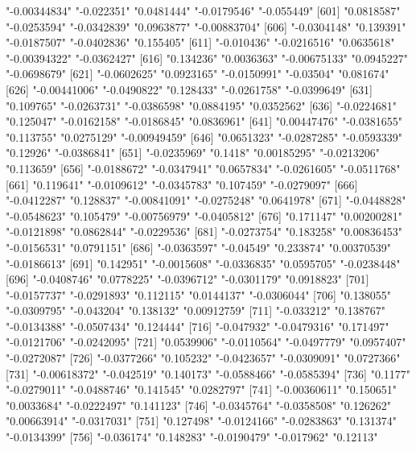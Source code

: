 \begin{Schunk}
\begin{Soutput}
[596] "-0.00344834"  "-0.022351"    "0.0481444"    "-0.0179546"   "-0.055449"   
[601] "0.0818587"    "-0.0253594"   "-0.0342839"   "0.0963877"    "-0.00883704" 
[606] "-0.0304148"   "0.139391"     "-0.0187507"   "-0.0402836"   "0.155405"    
[611] "-0.010436"    "-0.0216516"   "0.0635618"    "-0.00394322"  "-0.0362427"  
[616] "0.134236"     "0.0036363"    "-0.00675133"  "0.0945227"    "-0.0698679"  
[621] "-0.0602625"   "0.0923165"    "-0.0150991"   "-0.03504"     "0.081674"    
[626] "-0.00441006"  "-0.0490822"   "0.128433"     "-0.0261758"   "-0.0399649"  
[631] "0.109765"     "-0.0263731"   "-0.0386598"   "0.0884195"    "0.0352562"   
[636] "-0.0224681"   "0.125047"     "-0.0162158"   "-0.0186845"   "0.0836961"   
[641] "0.00447476"   "-0.0381655"   "0.113755"     "0.0275129"    "-0.00949459" 
[646] "0.0651323"    "-0.0287285"   "-0.0593339"   "0.12926"      "-0.0386841"  
[651] "-0.0235969"   "0.1418"       "0.00185295"   "-0.0213206"   "0.113659"    
[656] "-0.0188672"   "-0.0347941"   "0.0657834"    "-0.0261605"   "-0.0511768"  
[661] "0.119641"     "-0.0109612"   "-0.0345783"   "0.107459"     "-0.0279097"  
[666] "-0.0412287"   "0.128837"     "-0.00841091"  "-0.0275248"   "0.0641978"   
[671] "-0.0448828"   "-0.0548623"   "0.105479"     "-0.00756979"  "-0.0405812"  
[676] "0.171147"     "0.00200281"   "-0.0121898"   "0.0862844"    "-0.0229536"  
[681] "-0.0273754"   "0.183258"     "0.00836453"   "-0.0156531"   "0.0791151"   
[686] "-0.0363597"   "-0.04549"     "0.233874"     "0.00370539"   "-0.0186613"  
[691] "0.142951"     "-0.0015608"   "-0.0336835"   "0.0595705"    "-0.0238448"  
[696] "-0.0408746"   "0.0778225"    "-0.0396712"   "-0.0301179"   "0.0918823"   
[701] "-0.0157737"   "-0.0291893"   "0.112115"     "0.0144137"    "-0.0306044"  
[706] "0.138055"     "-0.0309795"   "-0.043204"    "0.138132"     "0.00912759"  
[711] "-0.033212"    "0.138767"     "-0.0134388"   "-0.0507434"   "0.124444"    
[716] "-0.047932"    "-0.0479316"   "0.171497"     "-0.0121706"   "-0.0242095"  
[721] "0.0539906"    "-0.0110564"   "-0.0497779"   "0.0957407"    "-0.0272087"  
[726] "-0.0377266"   "0.105232"     "-0.0423657"   "-0.0309091"   "0.0727366"   
[731] "-0.00618372"  "-0.042519"    "0.140173"     "-0.0588466"   "-0.0585394"  
[736] "0.1177"       "-0.0279011"   "-0.0488746"   "0.141545"     "0.0282797"   
[741] "-0.00360611"  "0.150651"     "0.0033684"    "-0.0222497"   "0.141123"    
[746] "-0.0345764"   "-0.0358508"   "0.126262"     "0.00663914"   "-0.0317031"  
[751] "0.127498"     "-0.0124166"   "-0.0283863"   "0.131374"     "-0.0134399"  
[756] "-0.036174"    "0.148283"     "-0.0190479"   "-0.017962"    "0.12113"     

\end{Soutput}
\end{Schunk}

